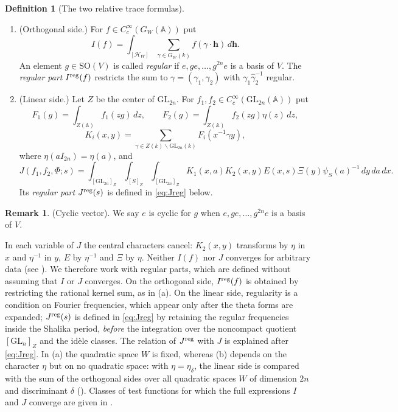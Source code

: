 \documentclass[11pt,oneside,notitlepage]{book}
\numberwithin{equation}{section}
\theoremstyle{plain}
\theoremstyle{definition}
\newtheorem{definition}[theorem]{Definition}
\newtheorem{remark}[theorem]{Remark}
\newcommand{\A}{\mathbb{A}}
\newcommand{\GL}{\mathrm{GL}}
\newcommand{\SO}{\mathrm{SO}}
\begin{document}
\begin{definition}[The two relative trace formulas]\label{def:RTF}
\begin{enumerate}[label=(\alph*)]
\item (Orthogonal side.) For $f\in C_c^\infty(G_W(\A))$ put
\[
 I(f)=\int_{[\mathcal H_W]}\sum_{\gamma\in G_W(k)}
 f(\gamma\cdot\mathbf h)\,d\mathbf h.
\]
An element $g\in\SO(V)$ is called \emph{regular} if $e,ge,\dots,g^{2n}e$ is a basis of $V$. The \emph{regular part} $I^{\rm reg}(f)$ restricts the sum to $\gamma=(\gamma_1,\gamma_2)$ with $\gamma_1\widehat\gamma_2^{-1}$ regular.
\item (Linear side.) Let $Z$ be the center of $\GL_{2n}$. For $f_1,f_2\in C_c^\infty(\GL_{2n}(\A))$ put
\[F_1(g)=\int_{Z(\A)}f_1(zg)\,dz,\qquad F_2(g)=\int_{Z(\A)}f_2(zg)\eta(z)\,dz,\]\[K_i(x,y)=\sum_{\gamma\in Z(k)\backslash\GL_{2n}(k)}F_i(x^{-1}\gamma y),\]
where $\eta(aI_{2n})=\eta(a)$, and
\[J(f_1,f_2,\Phi;s)=\int_{[\GL_{2n}]_Z}\int_{[S]_Z}\int_{[\GL_{2n}]_Z}K_1(x,a)K_2(x,y)E(x,s)\Xi(y)\psi_S(a)^{-1}\,dy\,da\,dx.\]
Its \emph{regular part} $J^{\rm reg}(s)$ is defined in \eqref{eq:Jreg} below.
\end{enumerate}
\end{definition}

\begin{remark}
	(Cyclic vector). We say $e$ is cyclic for $g$ when $e,ge,\dots,g^{2n}e$ is a basis of $V$.
\end{remark}

In each variable of $J$ the central characters cancel: $K_2(x,y)$ transforms by $\eta$ in $x$ and $\eta^{-1}$ in $y$, $E$ by $\eta^{-1}$ and $\Xi$ by $\eta$. Neither $I(f)$ nor $J$ converges for arbitrary data (see ). We therefore work with regular parts, which are defined without assuming that $I$ or $J$ converges. On the orthogonal side, $I^{\rm reg}(f)$ is obtained by restricting the rational kernel sum, as in (a). On the linear side, regularity is a condition on Fourier frequencies, which appear only after the theta forms are expanded; $J^{\rm reg}(s)$ is defined in \eqref{eq:Jreg} by retaining the regular frequencies inside the Shalika period, \emph{before} the integration over the noncompact quotient $[\GL_n]_Z$ and the id\`ele classes. The relation of $J^{\rm reg}$ with $J$ is explained after \eqref{eq:Jreg}. In (a) the quadratic space $W$ is fixed, whereas (b) depends on the character $\eta$ but on no quadratic space: with $\eta=\eta_\delta$, the linear side is compared with the sum of the orthogonal sides over all quadratic spaces $W$ of dimension $2n$ and discriminant $\delta$ (). Classes of test functions for which the full expressions $I$ and $J$ converge are given in .
\end{document}

